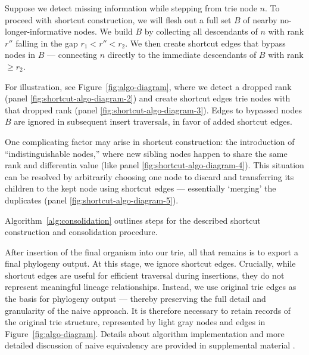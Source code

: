 Suppose we detect missing information while stepping from trie node $n$.
To proceed with shortcut construction, we will flesh out a full set $B$ of nearby no-longer-informative nodes.
We build $B$ by collecting all descendants of $n$ with rank $r''$ falling in the gap $r_1 < r'' < r_2$.
We then create shortcut edges that bypass nodes in $B$ --- connecting $n$ directly to the immediate descendants of $B$ with rank $\geq r_2$.

For illustration, see Figure~\ref{fig:algo-diagram}, where we detect a dropped rank (panel \ref{fig:shortcut-algo-diagram-2}) and create shortcut edges trie nodes with that dropped rank (panel \ref{fig:shortcut-algo-diagram-3}).
Edges to bypassed nodes $B$ are ignored in subsequent insert traversals, in favor of added shortcut edges.

One complicating factor may arise in shortcut construction: the introduction of ``indistinguishable nodes,'' where new sibling nodes happen to share the same rank and differentia value (like panel \ref{fig:shortcut-algo-diagram-4}).
This situation can be resolved by arbitrarily choosing one node to discard and transferring its children to the kept node using shortcut edges --- essentially `merging' the duplicates (panel \ref{fig:shortcut-algo-diagram-5}).

Algorithm~\ref{alg:consolidation} outlines steps for the described shortcut construction and consolidation procedure.



After insertion of the final organism into our trie, all that remains is to export a final phylogeny output.
At this stage, we ignore shortcut edges.
Crucially, while shortcut edges are useful for efficient traversal during insertions, they do not represent meaningful lineage relationships.
Instead, we use original trie edges as the basis for phylogeny output --- thereby preserving the full detail and granularity of the naive approach.
It is therefore necessary to retain records of the original trie structure, represented by light gray nodes and edges in Figure~\ref{fig:algo-diagram}.
Details about algorithm implementation and more detailed discussion of naive equivalency are provided in supplemental material \citep{supplemental}.

